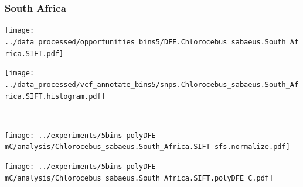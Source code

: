\subsubsection{South Africa}

\begin{minipage}{0.49\linewidth}
    \texttt{[image: ../data\_processed/opportunities\_bins5/DFE.Chlorocebus\_sabaeus.South\_Africa.SIFT.pdf]}
\end{minipage}
\begin{minipage}{0.49\linewidth}
    \texttt{[image: ../data\_processed/vcf\_annotate\_bins5/snps.Chlorocebus\_sabaeus.South\_Africa.SIFT.histogram.pdf]}
\end{minipage}
\\
\begin{minipage}{0.49\linewidth}
    \texttt{[image: ../experiments/5bins-polyDFE-mC/analysis/Chlorocebus\_sabaeus.South\_Africa.SIFT-sfs.normalize.pdf]}
\end{minipage}
\begin{minipage}{0.4\linewidth}
    \texttt{[image: ../experiments/5bins-polyDFE-mC/analysis/Chlorocebus\_sabaeus.South\_Africa.SIFT.polyDFE\_C.pdf]}
\end{minipage}
